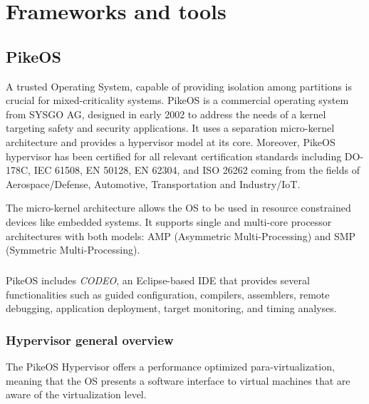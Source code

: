 
\chapter{Frameworks and tools}

\ifpdf
    \graphicspath{{Chapters/Figs/Raster/}{Chapters/Figs/PDF/}{Chapters/Figs/}}
\else
    \graphicspath{{Chapters/Figs/Vector/}{Chapters/Figs/}}
\fi


\section{PikeOS}
A trusted Operating System, capable of providing isolation among partitions is crucial for mixed-criticality systems. PikeOS \cite{PikeOS} is a commercial operating system from SYSGO AG, designed in early 2002 to address the needs of a kernel targeting safety and security applications. It uses a separation micro-kernel architecture and provides a hypervisor model at its core. Moreover, PikeOS hypervisor has been certified for all relevant certification standards including DO-178C, IEC 61508, EN 50128, EN 62304, and ISO 26262 coming from the fields of Aerospace/Defense, Automotive, Transportation and Industry/IoT.
\par The micro-kernel architecture allows the OS to be used in resource constrained devices like embedded systems. It supports single and multi-core processor architectures with both models: AMP (Asymmetric Multi-Processing) and SMP (Symmetric Multi-Processing).

\paragraph{}PikeOS includes \emph{CODEO}, an Eclipse-based IDE that provides several functionalities such as guided configuration, compilers, assemblers, remote debugging, application deployment, target monitoring, and timing analyses.

\subsection{Hypervisor general overview}
The PikeOS Hypervisor offers a performance optimized para-virtualization, meaning that the OS presents a software interface to virtual machines that are aware of the virtualization level.

